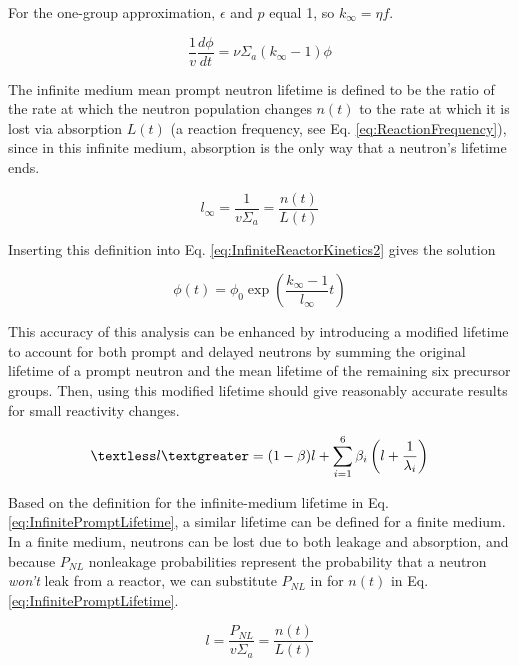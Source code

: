 \documentclass[10pt]{article}
\begin{document}
\begin{flushleft}
For the one-group approximation, \(\epsilon\) and \(p\) equal 1, so \(k_\infty=\eta f\).

\begin{equation}
\label{eq:InfiniteReactorKinetics2}
\frac{1}{v}\frac{d\phi}{dt}=\nu\Sigma_a(k_\infty-1)\phi
\end{equation}

The infinite medium mean prompt neutron lifetime is defined to be the ratio of the rate at which the neutron population changes \(n(t)\) to the rate at which it is lost via absorption \(L(t)\) (a reaction frequency, see Eq. \ref{eq:ReactionFrequency}), since in this infinite medium, absorption is the only way that a neutron's lifetime ends. 

\begin{equation}
\label{eq:InfinitePromptLifetime}
l_\infty=\frac{1}{v\Sigma_a}=\frac{n(t)}{L(t)}
\end{equation}

Inserting this definition into Eq. \ref{eq:InfiniteReactorKinetics2} gives the solution

\begin{equation}
\label{eq:InfiniteReactorKineticsSolution}
\phi(t)=\phi_0\exp\left(\frac{k_\infty-1}{l_\infty}t\right)
\end{equation}

This accuracy of this analysis can be enhanced by introducing a modified lifetime to account for both prompt and delayed neutrons by summing the original lifetime of a prompt neutron and the mean lifetime of the remaining six precursor groups. Then, using this modified lifetime should give reasonably accurate results for small reactivity changes. 

\begin{equation}
\label{eq:AdjustedLifetime}
\textless l\textgreater=(1-\beta)l+\sum_{i=1}^{6} \beta_i\left(l+\frac{1}{\lambda_i}\right)
\end{equation}

Based on the definition for the infinite-medium lifetime in Eq. \ref{eq:InfinitePromptLifetime}, a similar lifetime can be defined for a finite medium. In a finite medium, neutrons can be lost due to both leakage and absorption, and because \(P_{NL}\) nonleakage probabilities represent the probability that a neutron \textit{won't} leak from a reactor, we can substitute \(P_{NL}\) in for \(n(t)\) in Eq. \ref{eq:InfinitePromptLifetime}.

\begin{equation}
\label{eq:FinitePromptLifetime}
l=\frac{P_{NL}}{v\Sigma_a}=\frac{n(t)}{L(t)}
\end{equation}


\end{flushleft}
\end{document}
